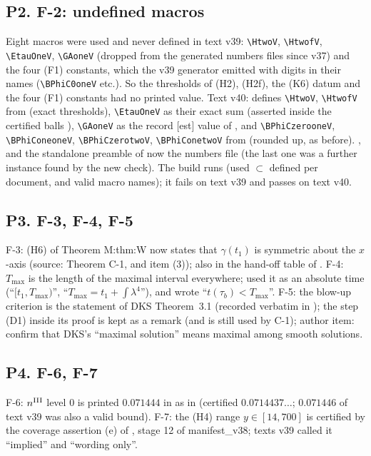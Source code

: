 \subsection*{P2. F-2: undefined macros}
Eight macros were used and never defined in text v39: \verb|\HtwoV|, \verb|\HtwofV|, \verb|\EtauOneV|, \verb|\GAoneV| (dropped from the generated numbers files since v37) and the four (F1) constants, which the v39 generator emitted with digits in their names (\verb|\BPhiC0oneV| etc.). So the thresholds of (H2), (H2f), the (K6) datum and the four (F1) constants had no printed value. Text v40:  defines \verb|\HtwoV|, \verb|\HtwofV| from   (exact thresholds), \verb|\EtauOneV| as their exact sum (asserted inside the certified balls ), \verb|\GAoneV| as the record [est] value of , and \verb|\BPhiCzerooneV|, \verb|\BPhiConeoneV|, \verb|\BPhiCzerotwoV|, \verb|\BPhiConetwoV| from   (rounded up, as before). ,  and the standalone preamble of  now \verb|| the numbers file (the last one was a further instance found by the new check). The build runs  (used $\subset$ defined per document, and valid macro names); it fails on text v39 and passes on text v40.
\subsection*{P3. F-3, F-4, F-5}
F-3: (H6) of Theorem M:thm:W now states that $\gamma(t_1)$ is symmetric about the $x$-axis (source: Theorem C-1, and  item (3)); also in the hand-off table of . F-4: $T_{\max}$ is the length of the maximal interval everywhere;  used it as an absolute time (``$[t_1,T_{\max})$'', ``$T_{\max}=t_1+\int\lambda^4$''), and  wrote ``$t(\tau_b)<T_{\max}$''. F-5: the blow-up criterion is the statement of DKS Theorem~3.1 (recorded verbatim in ); the step (D1) inside its proof is kept as a remark (and is still used by C-1); author item: confirm that DKS's ``maximal solution'' means maximal among smooth solutions.
\subsection*{P4. F-6, F-7}
F-6: $n^{\rm III}$ level 0 is printed $0.071444$ in  as in  (certified $0.0714437\ldots$; $0.071446$ of text v39 was also a valid bound). F-7: the (H4) range $y\in[14,700]$ is certified by the coverage assertion (e) of , stage 12 of manifest\_v38; texts v39 called it ``implied'' and ``wording only''.
